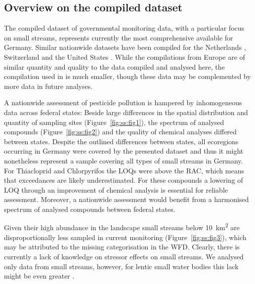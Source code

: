\subsection{Overview on the compiled dataset}
The compiled dataset of governmental monitoring data, with a particular focus on small streams, represents currently the most comprehensive available for Germany.
Similar nationwide datasets have been compiled for the Netherlands \citep{vijver_spatial_2008}, Switzerland \citep{munz_pestizidmessungen_2011} and the United States \citep{stone2014pesticides}.
While the compilations from Europe are of similar quantity and quality to the  data compiled and analysed here, the compilation used in \citet{stone2014pesticides} is much smaller, though these data may be complemented by more data in future analyses. 

A nationwide assessment of pesticide pollution is hampered by inhomogeneous data across federal states:
Beside large differences in the spatial distribution and quantity of sampling sites (Figure~\ref{fig:ss:fig1}), the spectrum of analysed compounds (Figure~\ref{fig:ss:fig2}) and the quality of chemical analyses differed between states. 
Despite the outlined differences between states, all ecoregions occurring in Germany \citep{illies1978limnofauna,abell2008freshwater} were covered by the presented dataset and thus it might nonetheless represent a sample covering all types of small streams in Germany. 
For Thiacloprid and Chlorpyrifos the LOQs were above the RAC, which means that exceedances are likely underestimated.
For these compounds a lowering of LOQ through an improvement of chemical analysis is essential for reliable assessment.
Moreover, a nationwide assessment would benefit from a harmonised spectrum of analysed compounds between federal states. 

Given their high abundance in the landscape \citep{nadeau_hydrological_2007} small streams below 10~km\textsuperscript{2} are disproportionally less sampled in current monitoring (Figure~\ref{fig:ss:fig3}), which may be attributed to the missing categorisation in the WFD. 
Clearly, there is currently a lack of knowledge on stressor effects on small streams.
We analysed only data from small streams, however, for lentic small water bodies this lack might be even greater \citep{lorenz_specifics_2016}. 



